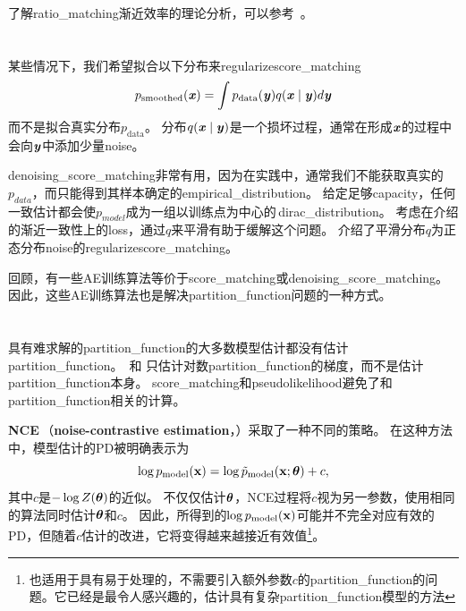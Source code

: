 了解\gls{ratio_matching}渐近效率的理论分析，可以参考~\cite{Marlin11-small}。

\section{}
\label{sec:denoising_score_matching}
某些情况下，我们希望拟合以下分布来\gls{regularize}\gls{score_matching}
\begin{equation}
	p_{\text{smoothed}}(\boldsymbol{\mathit{x}}) = \int p_{\text{data}} (\boldsymbol{\mathit{y}}) q( \boldsymbol{\mathit{x}} \mid \boldsymbol{\mathit{y}}) d \boldsymbol{\mathit{y}}
\end{equation}
而不是拟合真实分布$p_{\text{data}}$。
分布$q(\boldsymbol{\mathit{x}} \mid \boldsymbol{\mathit{y}})$是一个损坏过程，通常在形成$\boldsymbol{\mathit{x}}$的过程中会向$\boldsymbol{\mathit{y}}$中添加少量\gls{noise}。


\gls{denoising_score_matching}非常有用，因为在实践中，通常我们不能获取真实的$p_{data}$，而只能得到其样本确定的\gls{empirical_distribution}。
给定足够\gls{capacity}，任何一致估计都会使$p_{model}$成为一组以训练点为中心的\,\gls{dirac_distribution}。
考虑在介绍的渐近一致性上的\gls{loss}，通过$q$来平滑有助于缓解这个问题。
\cite{Kingma+LeCun-2010}介绍了平滑分布$q$为正态分布\gls{noise}的\gls{regularize}\gls{score_matching}。


回顾，有一些\gls{AE}训练算法等价于\gls{score_matching}或\gls{denoising_score_matching}。
因此，这些\gls{AE}训练算法也是解决\gls{partition_function}问题的一种方式。


\section{}
\label{sec:noise_contrastive_estimation}
具有难求解的\gls{partition_function}的大多数模型估计都没有估计\gls{partition_function}。
\,和\,\,只估计对数\gls{partition_function}的梯度，而不是估计\gls{partition_function}本身。
\gls{score_matching}和\gls{pseudolikelihood}避免了和\gls{partition_function}相关的计算。 


\textbf{\gls{NCE}}\,（\textbf{noise-contrastive estimation}，）\citep{Gutmann+Hyvarinen-2010}采取了一种不同的策略。
 在这种方法中，模型估计的\gls{PD}被明确表示为
\begin{equation}
	\log p_{\text{model}} (\mathbf{x}) = \log \tilde{p}_{\text{model}} (\mathbf{x}; \boldsymbol{\theta}) + c,
\end{equation}
其中$c$是$-\log Z(\boldsymbol{\theta})$的近似。
不仅仅估计$\boldsymbol{\theta}$，\gls{NCE}过程将$c$视为另一参数，使用相同的算法同时估计$\boldsymbol{\theta}$和$c$。
因此，所得到的$\log p_{\text{model}}(\mathbf{x})$可能并不完全对应有效的\gls{PD}，但随着$c$估计的改进，它将变得越来越接近有效值\footnote{也适用于具有易于处理的，不需要引入额外参数$c$的\gls{partition_function}的问题。它已经是最令人感兴趣的，估计具有复杂\gls{partition_function}模型的方法}。


